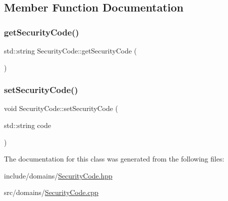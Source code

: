 \subsection{Member Function Documentation}
\mbox{\label{class_security_code_aacb04fcdfb3960ebdaa33b7ba518fc83}} 
\subsubsection{\texorpdfstring{getSecurityCode()}{getSecurityCode()}}
{\footnotesize\ttfamily std\+::string Security\+Code\+::get\+Security\+Code (\begin{DoxyParamCaption}{ }\end{DoxyParamCaption})}

\mbox{\label{class_security_code_a027077edcff7484b53def6ba4d94af01}} 
\subsubsection{\texorpdfstring{setSecurityCode()}{setSecurityCode()}}
{\footnotesize\ttfamily void Security\+Code\+::set\+Security\+Code (\begin{DoxyParamCaption}\item[{std\+::string}]{code }\end{DoxyParamCaption})}



The documentation for this class was generated from the following files\+:\begin{DoxyCompactItemize}
\item 
include/domains/\mbox{\hyperlink{_security_code_8hpp}{Security\+Code.\+hpp}}\item 
src/domains/\mbox{\hyperlink{_security_code_8cpp}{Security\+Code.\+cpp}}\end{DoxyCompactItemize}
